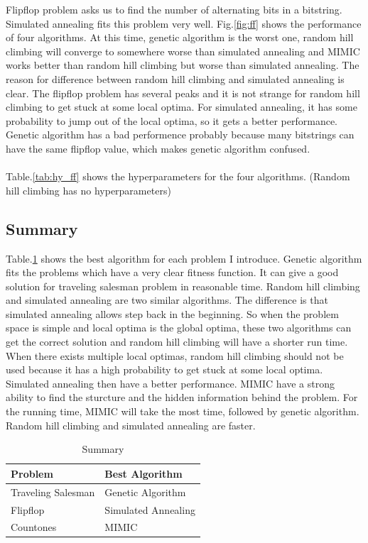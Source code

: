 \documentclass[11pt]{article}
\begin{document}
Flipflop problem asks us to find the number of alternating bits in a bitstring. Simulated annealing fits this problem very well. Fig.\ref{fig:ff} shows the performance of four algorithms. At this time, genetic algorithm is the worst one, random hill climbing will converge to somewhere worse than simulated annealing and MIMIC works better than random hill climbing but worse than simulated annealing. The reason for difference between random hill climbing and simulated annealing is clear. The flipflop problem has several peaks and it is not strange for random hill climbing to get stuck at some local optima. For simulated annealing, it has some probability to jump out of the local optima, so it gets a better performance. Genetic algorithm has a bad performence probably because many bitstrings can have the same flipflop value, which makes genetic algorithm confused. \\
\\Table.\ref{tab:hy_ff} shows the hyperparameters for the four algorithms. (Random hill climbing has no hyperparameters)

\subsection{Summary}
Table.\ref{tab:all} shows the best algorithm for each problem I introduce. Genetic algorithm fits the problems which have a very clear fitness function. It can give a good solution for traveling salesman problem in reasonable time. Random hill climbing and simulated annealing are two similar algorithms. The difference is that simulated annealing allows step back in the beginning. So when the problem space is simple and local optima is the global optima, these two algorithms can get the correct solution and random hill climbing will have a shorter run time. When there exists multiple local optimas, random hill climbing should not be used because it has a high probability to get stuck at some local optima. Simulated annealing then have a better performance. MIMIC have a strong ability to find the sturcture and the hidden information behind the problem. For the running time, MIMIC will take the most time, followed by genetic algorithm. Random hill climbing and simulated annealing are faster.
\begin{table}[h!]
  \begin{center}
    \caption{Summary}
    \label{tab:all}
    \begin{tabular}{l|l}
      \textbf{Problem} & \textbf{Best Algorithm}\\
      \hline
      Traveling Salesman & Genetic Algorithm\\
      Flipflop & Simulated Annealing \\
      Countones & MIMIC\\
    \end{tabular}
  \end{center}
\end{table}
\end{document}
